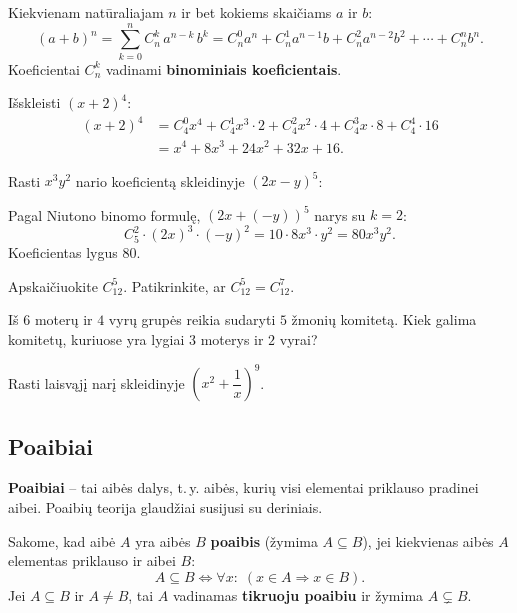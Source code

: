 \begin{theorem}
Kiekvienam natūraliajam $n$ ir bet kokiems skaičiams $a$ ir $b$:
\[
(a+b)^n = \sum_{k=0}^{n} C_n^k \, a^{n-k} \, b^{k} = C_n^0 a^n + C_n^1 a^{n-1}b + C_n^2 a^{n-2}b^2 + \cdots + C_n^n b^n.
\]
Koeficientai $C_n^k$ vadinami \textbf{binominiais koeficientais}.
\end{theorem}

\begin{example}
Išskleisti $(x + 2)^4$:
\begin{align*}
(x+2)^4 &= C_4^0 x^4 + C_4^1 x^3 \cdot 2 + C_4^2 x^2 \cdot 4 + C_4^3 x \cdot 8 + C_4^4 \cdot 16 \\
&= x^4 + 8x^3 + 24x^2 + 32x + 16.
\end{align*}
\end{example}

\begin{example}
Rasti $x^3 y^2$ nario koeficientą skleidinyje $(2x - y)^5$:

Pagal Niutono binomo formulę, $(2x + (-y))^5$ narys su $k = 2$:
\[
C_5^2 \cdot (2x)^{3} \cdot (-y)^{2} = 10 \cdot 8x^3 \cdot y^2 = 80 x^3 y^2.
\]
Koeficientas lygus $80$.
\end{example}

\begin{exercise}
Apskaičiuokite $C_{12}^5$. Patikrinkite, ar $C_{12}^5 = C_{12}^7$.
\end{exercise}

\begin{exercise}
Iš $6$ moterų ir $4$ vyrų grupės reikia sudaryti $5$ žmonių komitetą. Kiek galima komitetų, kuriuose yra lygiai $3$ moterys ir $2$ vyrai?
\end{exercise}

\begin{exercise}
Rasti laisvąjį narį skleidinyje $\left(x^2 + \dfrac{1}{x}\right)^9$.
\end{exercise}

\subsection{Poaibiai}

\textbf{Poaibiai} -- tai aibės dalys, t.\,y. aibės, kurių visi elementai priklauso pradinei aibei. Poaibių teorija glaudžiai susijusi su deriniais.

\begin{definition}[Poaibis]
Sakome, kad aibė $A$ yra aibės $B$ \textbf{poaibis} (žymima $A \subseteq B$), jei kiekvienas aibės $A$ elementas priklauso ir aibei $B$:
\[
A \subseteq B \iff \forall x:\; (x \in A \Rightarrow x \in B).
\]
Jei $A \subseteq B$ ir $A \neq B$, tai $A$ vadinamas \textbf{tikruoju poaibiu} ir žymima $A \subsetneq B$.
\end{definition}

